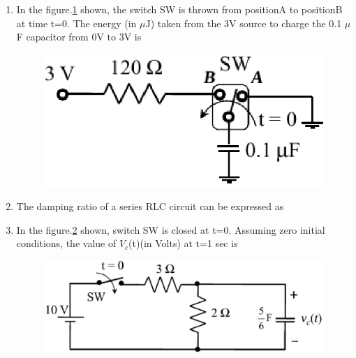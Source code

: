\documentclass[journal,12pt,twocolumn]{IEEEtran}
\begin{document}
\begin{enumerate}
\item In the figure.\ref{fig102} shown, the switch SW is thrown from positionA to positionB at time t=0. The energy (in $ \mu $J) taken from the 3V source to charge the 0.1 $\mu$F capacitor from 0V to 3V is
\begin{enumerate}
\setlength\itemsep{2em}
\begin{figure}[!h]
\begin{center}
\includegraphics[scale=0.7]{./figs/fig102.eps}
\caption{}
\label{fig102}
\end{center}
\end{figure}
\end{enumerate}

\item The damping ratio of a series RLC circuit can be expressed as
\begin{enumerate}
\setlength\itemsep{2em}
\end{enumerate}

\item In the figure.\ref{fig103} shown, switch SW is closed at t=0. Assuming zero initial conditions, the value of $V_{c}$(t)(in Volts) at t=1 sec is
\begin{figure}[!h]
\begin{center}
\includegraphics[scale=0.5]{./figs/fig103.eps}
\caption{}
\label{fig103}
\end{center}
\end{figure}


\end{enumerate}
\end{document}

